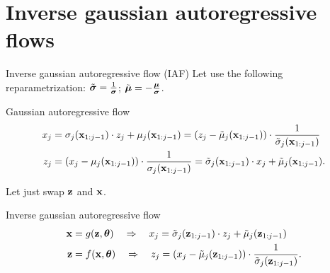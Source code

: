 \section{Inverse gaussian autoregressive flows}
\begin{frame}{Inverse gaussian autoregressive flow (IAF)}
	Let use the following reparametrization:
	$\tilde{\boldsymbol{\sigma}} = \frac{1}{\boldsymbol{\sigma}}$; $ \tilde{\boldsymbol{\mu}} = - \frac{\boldsymbol{\mu}}{\boldsymbol{\sigma}}$.
	
	\begin{block}{Gaussian autoregressive flow}
		\vspace{-0.5cm}
		\begin{align*}
			x_j &= \sigma_j (\mathbf{x}_{1:j-1}) \cdot z_j + \mu_j(\mathbf{x}_{1:j-1}) =  \left( z_j - \tilde{\mu}_j(\mathbf{x}_{1:j-1})\right) \cdot \frac{1}{\tilde{\sigma}_j (\mathbf{x}_{1:j-1}) }\\
			z_j &= \left(x_j - \mu_j(\mathbf{x}_{1:j-1}) \right) \cdot \frac{1}{ \sigma_j (\mathbf{x}_{1:j-1})} = \tilde{\sigma}_j (\mathbf{x}_{1:j-1}) \cdot x_j + \tilde{\mu}_j(\mathbf{x}_{1:j-1}).
		\end{align*}
		\vspace{-0.3cm}
	\end{block}
	Let just swap $\mathbf{z}$ and $\mathbf{x}$. 
	
	\begin{block}{Inverse gaussian autoregressive flow}
		\vspace{-0.5cm}
		\begin{align*}
			\mathbf{x} &= g(\mathbf{z}, \boldsymbol{\theta}) \quad \Rightarrow \quad x_j = \tilde{\sigma}_j (\mathbf{z}_{1:j-1}) \cdot z_j + \tilde{\mu}_j(\mathbf{z}_{1:j-1}) \\
			\mathbf{z} &= f(\mathbf{x}, \boldsymbol{\theta}) \quad \Rightarrow \quad z_j = \left( x_j - \tilde{\mu}_j(\mathbf{z}_{1:j-1})\right) \cdot \frac{1}{\tilde{\sigma}_j (\mathbf{z}_{1:j-1}) }.
		\end{align*}
		\vspace{-0.3cm}
	\end{block}
	
\end{frame}
